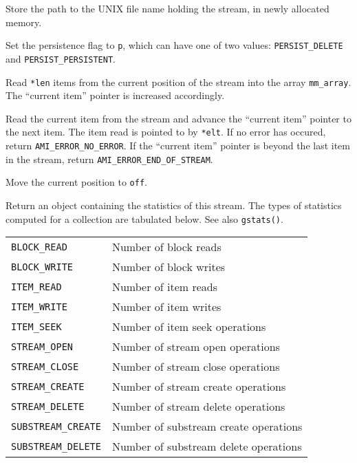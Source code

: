      {Store the path to the UNIX
file name holding the stream, in newly allocated memory.}

     {Set the persistence flag to \lstinline|p|,
    which can have one of two values: \lstinline|PERSIST_DELETE| and
    \lstinline|PERSIST_PERSISTENT|.}

     {Read \lstinline|*len| items from
the current position of the stream into the array \lstinline|mm_array|. The
``current item'' pointer is increased accordingly. }

     {Read the current item from the stream and
    advance the ``current item'' pointer to the next item. The item read is
    pointed to by \lstinline|*elt|. If no error has occured, return
\lstinline|AMI_ERROR_NO_ERROR|. If the ``current item'' pointer is beyond
the last item in the stream, return \lstinline|AMI_ERROR_END_OF_STREAM|.}
    
     {Move the current position to \lstinline|off|.}

     {Return an
    object containing the statistics of this stream. The types of
    statistics computed for a collection are tabulated below. See also
    \lstinline|gstats()|.\\[1mm] \begin{tabular}{|l|l|} \hline \lstinline|BLOCK_READ|
    & Number of block reads\\ \lstinline|BLOCK_WRITE| & Number of block
    writes \\ \lstinline|ITEM_READ| & Number of item reads\\
    \lstinline|ITEM_WRITE| & Number of item writes\\ \lstinline|ITEM_SEEK| &
    Number of item seek operations\\ \lstinline|STREAM_OPEN| & Number of
    stream open operations\\ \lstinline|STREAM_CLOSE| & Number of stream
    close operations \\ \lstinline|STREAM_CREATE| & Number of stream create
    operations\\ \lstinline|STREAM_DELETE| & Number of stream delete
    operations \\ \lstinline|SUBSTREAM_CREATE| & Number of substream create
    operations\\ \lstinline|SUBSTREAM_DELETE| & Number of substream delete
    operations \\ \hline \end{tabular} }

